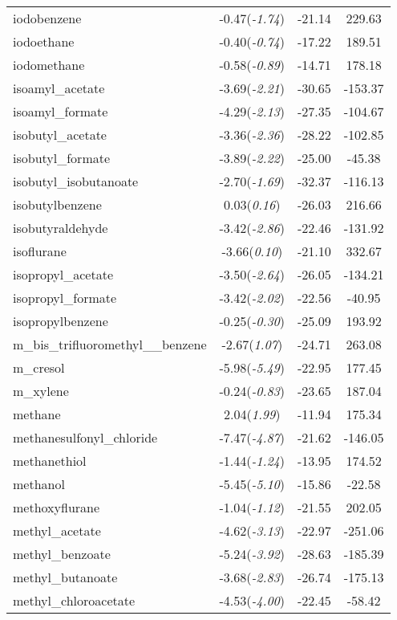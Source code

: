 \documentclass{amsart}
\begin{document}
\begin{center}
\begin{longtable}{l|c|c|c}
iodobenzene & -0.47(\textit{-1.74}) & -21.14 & 229.63 \\ 
iodoethane & -0.40(\textit{-0.74}) & -17.22 & 189.51 \\ 
iodomethane & -0.58(\textit{-0.89}) & -14.71 & 178.18 \\ 
isoamyl\_acetate & -3.69(\textit{-2.21}) & -30.65 & -153.37 \\ 
isoamyl\_formate & -4.29(\textit{-2.13}) & -27.35 & -104.67 \\ 
isobutyl\_acetate & -3.36(\textit{-2.36}) & -28.22 & -102.85 \\ 
isobutyl\_formate & -3.89(\textit{-2.22}) & -25.00 & -45.38 \\ 
isobutyl\_isobutanoate & -2.70(\textit{-1.69}) & -32.37 & -116.13 \\ 
isobutylbenzene & 0.03(\textit{0.16}) & -26.03 & 216.66 \\ 
isobutyraldehyde & -3.42(\textit{-2.86}) & -22.46 & -131.92 \\ 
isoflurane & -3.66(\textit{0.10}) & -21.10 & 332.67 \\ 
isopropyl\_acetate & -3.50(\textit{-2.64}) & -26.05 & -134.21 \\ 
isopropyl\_formate & -3.42(\textit{-2.02}) & -22.56 & -40.95 \\ 
isopropylbenzene & -0.25(\textit{-0.30}) & -25.09 & 193.92 \\ 
m\_bis\_trifluoromethyl\_\_benzene & -2.67(\textit{1.07}) & -24.71 & 263.08 \\ 
m\_cresol & -5.98(\textit{-5.49}) & -22.95 & 177.45 \\ 
m\_xylene & -0.24(\textit{-0.83}) & -23.65 & 187.04 \\ 
methane & 2.04(\textit{1.99}) & -11.94 & 175.34 \\ 
methanesulfonyl\_chloride & -7.47(\textit{-4.87}) & -21.62 & -146.05 \\ 
methanethiol & -1.44(\textit{-1.24}) & -13.95 & 174.52 \\ 
methanol & -5.45(\textit{-5.10}) & -15.86 & -22.58 \\ 
methoxyflurane & -1.04(\textit{-1.12}) & -21.55 & 202.05 \\ 
methyl\_acetate & -4.62(\textit{-3.13}) & -22.97 & -251.06 \\ 
methyl\_benzoate & -5.24(\textit{-3.92}) & -28.63 & -185.39 \\ 
methyl\_butanoate & -3.68(\textit{-2.83}) & -26.74 & -175.13 \\ 
methyl\_chloroacetate & -4.53(\textit{-4.00}) & -22.45 & -58.42 \\ 

\end{longtable}
\end{center}
\end{document}
